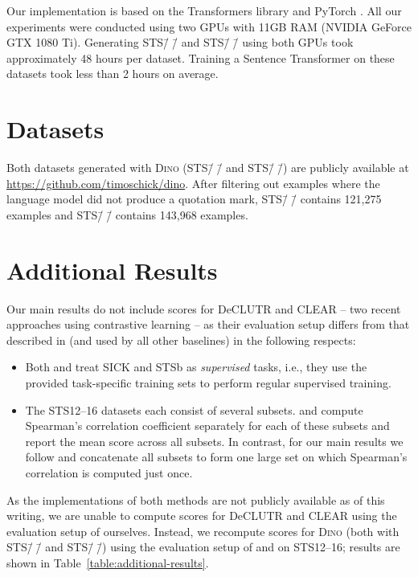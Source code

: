 \documentclass[11pt]{article}
\newcommand\ours{\textsc{Dino}}
\newcommand\ourDsFull{STS\=/🦕\=/}
\newcommand\ourDsSemi{STS\=/🦕\=/}
\begin{document}
Our implementation is based on the Transformers library \citep{wolf2019transformers} and PyTorch \citep{paszke2017automatic}. All our experiments were conducted using two GPUs with 11GB RAM (NVIDIA GeForce GTX 1080 Ti). Generating \ourDsFull{} and \ourDsSemi{} using both GPUs took approximately 48 hours per dataset. Training a Sentence Transformer on these datasets took less than 2 hours on average.

\section{Datasets}

Both datasets generated with \ours{} (\ourDsFull{} and \ourDsSemi{}) are publicly available at \url{https://github.com/timoschick/dino}. After filtering out examples where the language model did not produce a quotation mark, \ourDsSemi{} contains 121,275 examples and \ourDsFull{} contains 143,968 examples.

\section{Additional Results}

Our main results do not include scores for DeCLUTR \citep{giorgi2020declutr} and CLEAR \citep{wu2020clear} -- two recent approaches using contrastive learning -- as their evaluation setup differs from that described in \citet{reimers-gurevych-2019-sentence} (and used by all other baselines) in the following respects:
\begin{itemize}
	\item Both \citet{giorgi2020declutr} and \citet{wu2020clear} treat SICK and STSb as \emph{supervised} tasks, i.e., they use the provided task-specific training sets to perform regular supervised training.
	\item The STS12--16 datasets each consist of several subsets. \citet{giorgi2020declutr} and \citet{wu2020clear} compute Spearman's correlation coefficient separately for each of these subsets and report the mean score across all subsets. In contrast, for our main results we follow \citet{reimers-gurevych-2019-sentence} and concatenate all subsets to form one large set on which Spearman's correlation is computed just once.
\end{itemize}
As the implementations of both methods are not publicly available as of this writing, we are unable to compute scores for DeCLUTR and CLEAR using the evaluation setup of \citet{reimers-gurevych-2019-sentence} ourselves. Instead, we recompute scores for \ours{} (both with \ourDsSemi{} and \ourDsFull{}) using the evaluation setup of \citet{giorgi2020declutr} and \citet{wu2020clear} on STS12--16; results are shown in Table~\ref{table:additional-results}.
\end{document}
